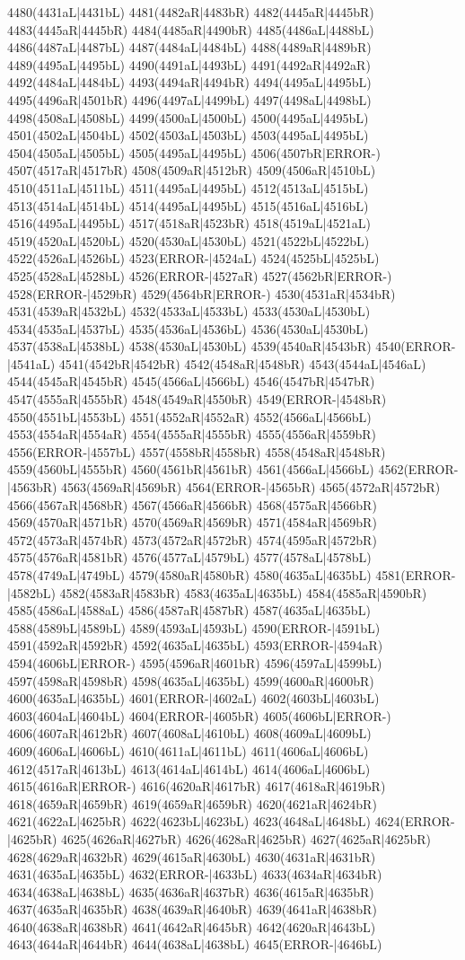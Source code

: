 4480(4431aL|4431bL) 4481(4482aR|4483bR) 4482(4445aR|4445bR) 4483(4445aR|4445bR) 4484(4485aR|4490bR) 4485(4486aL|4488bL) 4486(4487aL|4487bL) 4487(4484aL|4484bL) 4488(4489aR|4489bR) 4489(4495aL|4495bL) 4490(4491aL|4493bL) 4491(4492aR|4492aR) 4492(4484aL|4484bL) 4493(4494aR|4494bR) 4494(4495aL|4495bL) 4495(4496aR|4501bR) 4496(4497aL|4499bL) 4497(4498aL|4498bL) 4498(4508aL|4508bL) 4499(4500aL|4500bL) 4500(4495aL|4495bL) 4501(4502aL|4504bL) 4502(4503aL|4503bL) 4503(4495aL|4495bL) 4504(4505aL|4505bL) 4505(4495aL|4495bL) 4506(4507bR|ERROR-) 4507(4517aR|4517bR) 4508(4509aR|4512bR) 4509(4506aR|4510bL) 4510(4511aL|4511bL) 4511(4495aL|4495bL) 4512(4513aL|4515bL) 4513(4514aL|4514bL) 4514(4495aL|4495bL) 4515(4516aL|4516bL) 4516(4495aL|4495bL) 4517(4518aR|4523bR) 4518(4519aL|4521aL) 4519(4520aL|4520bL) 4520(4530aL|4530bL) 4521(4522bL|4522bL) 4522(4526aL|4526bL) 4523(ERROR-|4524aL) 4524(4525bL|4525bL) 4525(4528aL|4528bL) 4526(ERROR-|4527aR) 4527(4562bR|ERROR-) 4528(ERROR-|4529bR) 4529(4564bR|ERROR-) 4530(4531aR|4534bR) 4531(4539aR|4532bL) 4532(4533aL|4533bL) 4533(4530aL|4530bL) 4534(4535aL|4537bL) 4535(4536aL|4536bL) 4536(4530aL|4530bL) 4537(4538aL|4538bL) 4538(4530aL|4530bL) 4539(4540aR|4543bR) 4540(ERROR-|4541aL) 4541(4542bR|4542bR) 4542(4548aR|4548bR) 4543(4544aL|4546aL) 4544(4545aR|4545bR) 4545(4566aL|4566bL) 4546(4547bR|4547bR) 4547(4555aR|4555bR) 4548(4549aR|4550bR) 4549(ERROR-|4548bR) 4550(4551bL|4553bL) 4551(4552aR|4552aR) 4552(4566aL|4566bL) 4553(4554aR|4554aR) 4554(4555aR|4555bR) 4555(4556aR|4559bR) 4556(ERROR-|4557bL) 4557(4558bR|4558bR) 4558(4548aR|4548bR) 4559(4560bL|4555bR) 4560(4561bR|4561bR) 4561(4566aL|4566bL) 4562(ERROR-|4563bR) 4563(4569aR|4569bR) 4564(ERROR-|4565bR) 4565(4572aR|4572bR) 4566(4567aR|4568bR) 4567(4566aR|4566bR) 4568(4575aR|4566bR) 4569(4570aR|4571bR) 4570(4569aR|4569bR) 4571(4584aR|4569bR) 4572(4573aR|4574bR) 4573(4572aR|4572bR) 4574(4595aR|4572bR) 4575(4576aR|4581bR) 4576(4577aL|4579bL) 4577(4578aL|4578bL) 4578(4749aL|4749bL) 4579(4580aR|4580bR) 4580(4635aL|4635bL) 4581(ERROR-|4582bL) 4582(4583aR|4583bR) 4583(4635aL|4635bL) 4584(4585aR|4590bR) 4585(4586aL|4588aL) 4586(4587aR|4587bR) 4587(4635aL|4635bL) 4588(4589bL|4589bL) 4589(4593aL|4593bL) 4590(ERROR-|4591bL) 4591(4592aR|4592bR) 4592(4635aL|4635bL) 4593(ERROR-|4594aR) 4594(4606bL|ERROR-) 4595(4596aR|4601bR) 4596(4597aL|4599bL) 4597(4598aR|4598bR) 4598(4635aL|4635bL) 4599(4600aR|4600bR) 4600(4635aL|4635bL) 4601(ERROR-|4602aL) 4602(4603bL|4603bL) 4603(4604aL|4604bL) 4604(ERROR-|4605bR) 4605(4606bL|ERROR-) 4606(4607aR|4612bR) 4607(4608aL|4610bL) 4608(4609aL|4609bL) 4609(4606aL|4606bL) 4610(4611aL|4611bL) 4611(4606aL|4606bL) 4612(4517aR|4613bL) 4613(4614aL|4614bL) 4614(4606aL|4606bL) 4615(4616aR|ERROR-) 4616(4620aR|4617bR) 4617(4618aR|4619bR) 4618(4659aR|4659bR) 4619(4659aR|4659bR) 4620(4621aR|4624bR) 4621(4622aL|4625bR) 4622(4623bL|4623bL) 4623(4648aL|4648bL) 4624(ERROR-|4625bR) 4625(4626aR|4627bR) 4626(4628aR|4625bR) 4627(4625aR|4625bR) 4628(4629aR|4632bR) 4629(4615aR|4630bL) 4630(4631aR|4631bR) 4631(4635aL|4635bL) 4632(ERROR-|4633bL) 4633(4634aR|4634bR) 4634(4638aL|4638bL) 4635(4636aR|4637bR) 4636(4615aR|4635bR) 4637(4635aR|4635bR) 4638(4639aR|4640bR) 4639(4641aR|4638bR) 4640(4638aR|4638bR) 4641(4642aR|4645bR) 4642(4620aR|4643bL) 4643(4644aR|4644bR) 4644(4638aL|4638bL) 4645(ERROR-|4646bL) 